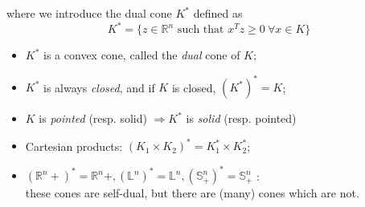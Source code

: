 \documentclass[10pt,a4paper]{article}
\begin{document}
\vspace{0.3cm}
\noindent where we introduce the dual cone $K^*$ defined as 
\[ K^* = \{ z \in \mathbb{R}^n \text{ such that }
x^T z \geq 0 \ \forall x \in K \} \]

\begin{itemize}
\item $K^*$ is a convex cone, called the \emph{dual} cone of $K$;
\item $K^*$ is always \emph{closed}, and if $K$ is closed, $(K^*)^* = K$; \item $K$ is \emph{pointed} (resp. 
    solid) $\Rightarrow K^*$ is \emph{solid} (resp. pointed) \item Cartesian products: $(K_1 \times K_2)^*
    = K_1^* \times K_2^*$;
\item $(\mathbb{R}^n+)^* = \mathbb{R}^n+, (\mathbb{L}^n)^* = \mathbb{L}^n, (\mathbb{S}_+^n)^* = \mathbb{S}_+^n$ : \\these cones are self-dual, but there are (many) cones which are not.
\end{itemize}
\end{document}
